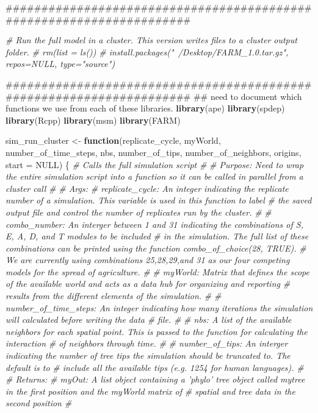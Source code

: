 \documentclass[]{book}
\newenvironment{Shaded}{\begin{snugshade}}{\end{snugshade}}
\newcommand{\KeywordTok}[1]{\textcolor[rgb]{0.13,0.29,0.53}{\textbf{{#1}}}}
\newcommand{\DataTypeTok}[1]{\textcolor[rgb]{0.13,0.29,0.53}{{#1}}}
\newcommand{\StringTok}[1]{\textcolor[rgb]{0.31,0.60,0.02}{{#1}}}
\newcommand{\CommentTok}[1]{\textcolor[rgb]{0.56,0.35,0.01}{\textit{{#1}}}}
\newcommand{\OtherTok}[1]{\textcolor[rgb]{0.56,0.35,0.01}{{#1}}}
\newcommand{\ControlFlowTok}[1]{\textcolor[rgb]{0.13,0.29,0.53}{\textbf{{#1}}}}
\newcommand{\NormalTok}[1]{{#1}}
\theoremstyle{definition}
\theoremstyle{definition}
\theoremstyle{definition}
\theoremstyle{remark}
\begin{document}
\begin{Shaded}
\begin{Highlighting}[]
\NormalTok{#####################################################################}

\CommentTok{# Run the full model in a cluster. This version writes files to a cluster output folder.}
\CommentTok{# rm(list = ls())}
\CommentTok{# install.packages("~/Desktop/FARM_1.0.tar.gz", repos=NULL, type="source")}


\NormalTok{#####################################################################}
\NormalTok{## need to document which functions we use from each of these libraries. }
\KeywordTok{library}\NormalTok{(ape)}
\KeywordTok{library}\NormalTok{(spdep)}
\KeywordTok{library}\NormalTok{(Rcpp)}
\KeywordTok{library}\NormalTok{(msm)}
\KeywordTok{library}\NormalTok{(FARM)}


\NormalTok{sim_run_cluster <-}\StringTok{ }\ControlFlowTok{function}\NormalTok{(replicate_cycle, myWorld, number_of_time_steps, nbs,}
\NormalTok{                            number_of_tips, number_of_neighbors, origins, }\DataTypeTok{start =} \OtherTok{NULL}\NormalTok{) \{}
  \CommentTok{# Calls the full simulation script }
  \CommentTok{#  }
  \CommentTok{# Purpose: Need to wrap the entire simulation script into a function so it can be called in parallel from a cluster call  }
  \CommentTok{#}
  \CommentTok{# Args:}
  \CommentTok{#    replicate_cycle: An integer indicating the replicate number of a simulation. This variable is used in this function to label        }
  \CommentTok{#         the saved output file and control the number of replicates run by the cluster.}
  \CommentTok{#}
  \CommentTok{#    combo_number: An interger between 1 and 31 indicating the combinations of S, E, A, D, and T modules to be included }
  \CommentTok{#         in the simulation. The full list of these combinations can be printed using the function combo_of_choice(28, TRUE).}
  \CommentTok{#         We are currently using combinations 25,28,29,and 31 as our four competing models for the spread of agriculture.  }
  \CommentTok{#}
  \CommentTok{#    myWorld: Matrix that defines the scope of the available world and acts as a data hub for organizing and reporting      }
  \CommentTok{#         results from the different elements of the simulation. }
  \CommentTok{#}
  \CommentTok{#    number_of_time_steps: An integer indicating how many iterations the simulation will calculated before writing the data }
  \CommentTok{#         file. }
  \CommentTok{#}
  \CommentTok{#    nbs: A list of the available neighbors for each spatial point. This is passed to the function for calculating the interaction }
  \CommentTok{#         of neighbors through time. }
  \CommentTok{#}
  \CommentTok{#    number_of_tips: An interger indicating the number of tree tips the simulation should be truncated to. The default is to }
  \CommentTok{#         include all the available tips (e.g. 1254 for human languages). }
  \CommentTok{#}
  \CommentTok{# Returns: }
  \CommentTok{#    myOut: A list object containing a 'phylo' tree object called mytree in the first position and the myWorld matrix of }
  \CommentTok{#         spatial and tree data in the second position }
  \CommentTok{#     }
  


\end{Highlighting}
\end{Shaded}
\end{document}
